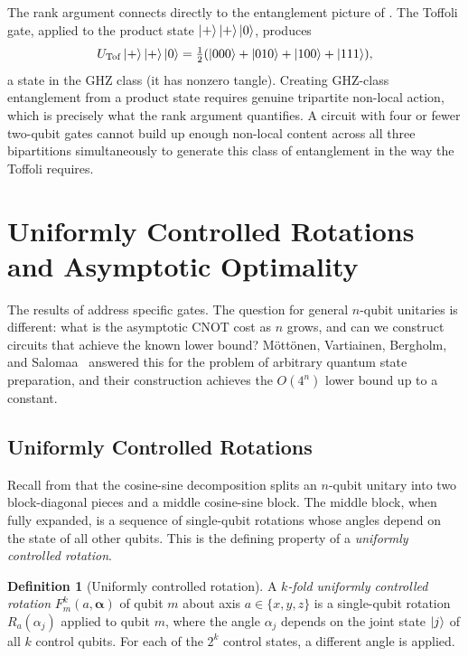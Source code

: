 \documentclass[12pt, a4paper, oneside]{report}
\theoremstyle{plain}
\theoremstyle{definition}
\newtheorem{definition}[theorem]{Definition}
\theoremstyle{remark}
\begin{document}
The rank argument connects directly to the entanglement picture of
. The Toffoli gate, applied to the product state
$\ket{+}\ket{+}\ket{0}$, produces
\[
	U_{\mathrm{Tof}}\ket{+}\ket{+}\ket{0}
	= \tfrac{1}{2}(\ket{000}+\ket{010}+\ket{100}+\ket{111}),
\]
a state in the GHZ class (it has nonzero tangle). Creating GHZ-class entanglement from a
product state requires genuine tripartite non-local action, which is precisely what the rank
argument quantifies. A circuit with four or fewer two-qubit gates cannot build up enough
non-local content across all three bipartitions simultaneously to generate this class of
entanglement in the way the Toffoli requires.


\section{Uniformly Controlled Rotations and Asymptotic Optimality}
\label{sec:ucr}

The results of  address specific gates. The question
for general $n$-qubit unitaries is different: what is the asymptotic CNOT cost as $n$ grows,
and can we construct circuits that achieve the known lower bound? Möttönen, Vartiainen,
Bergholm, and Salomaa~\cite{mottonen2004} answered this for the problem of arbitrary quantum
state preparation, and their construction achieves the $O(4^n)$ lower bound up to a constant.

\subsection{Uniformly Controlled Rotations}

Recall from  that the cosine-sine decomposition splits an $n$-qubit unitary
into two block-diagonal pieces and a middle cosine-sine block. The middle block, when fully
expanded, is a sequence of single-qubit rotations whose angles depend on the state of all
other qubits. This is the defining property of a \emph{uniformly controlled rotation}.

\begin{definition}[Uniformly controlled rotation]
	A \emph{$k$-fold uniformly controlled rotation} $F^k_m(a, \boldsymbol{\alpha})$ of qubit $m$
	about axis $a \in \{x, y, z\}$ is a single-qubit rotation $R_a(\alpha_j)$ applied to qubit
	$m$, where the angle $\alpha_j$ depends on the joint state $\ket{j}$ of all $k$ control
	qubits. For each of the $2^k$ control states, a different angle is applied.
\end{definition}
\end{document}
